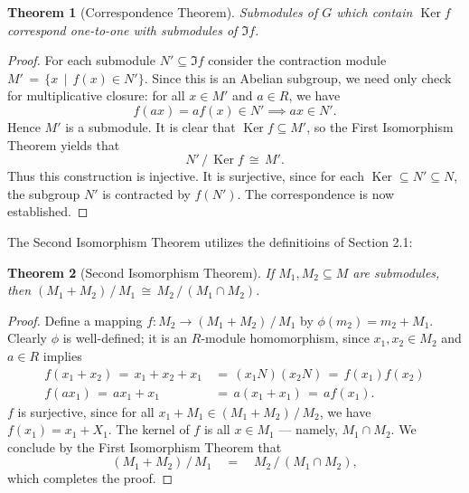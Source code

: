 \documentclass[11pt]{article}
\newtheorem{theorem}{Theorem}
\newcommand{\Ker}{\operatorname{Ker}}
\begin{document}
\begin{adjustwidth}{0.5cm}{}
  \begin{theorem}[Correspondence Theorem]
    Submodules of $G$ which contain $\Ker f$ correspond one-to-one with submodules of $\Im f$.
  \end{theorem}
  \begin{proof}
    For each submodule $N' \subseteq \Im f$ consider the contraction module $M' \, = \, \{ x \, \mid \, f(x) \in N' \}$. Since this is an Abelian subgroup, we need only check for multiplicative closure: for all $x \in M'$ and $a \in R$, we have
    \[
      f(ax) = a f(x) \in N' \implies ax \in N'.
    \]
    Hence $M'$ is a submodule. It is clear that $\Ker f \subseteq M'$, so the First Isomorphism Theorem yields that
    \[
      N' \, / \, \Ker f \, \cong \, M'.
    \]
    Thus this construction is injective. It is surjective, since for each $\Ker \subseteq N' \subseteq N$, the subgroup $N'$ is contracted by $f(N')$. The correspondence is now established.
  \end{proof}
\end{adjustwidth}

The Second Isomorphism Theorem utilizes the definitioins of Section 2.1:

\begin{adjustwidth}{0.5cm}{}
  \begin{theorem}[Second Isomorphism Theorem]
    If $M_{1}, M_{2} \subseteq M$ are submodules, then $(M_{1} + M_{2}) \, / \, M_{1} \, \cong \, M_{2} \, / \, (M_{1} \cap M_{2})$.
  \end{theorem}
  \begin{proof}
    Define a mapping $f : M_{2} \to (M_{1} + M_{2}) \, / \, M_{1}$ by $\phi(m_{2}) = m_{2} + M_{1}$. Clearly $\phi$ is well-defined; it is an $R$-module homomorphism, since $x_{1}, x_{2} \in M_{2}$ and $a \in R$ implies
    \begin{align*}
      f(x_{1} + x_{2}) \, = \, x_{1} + x_{2} + x_{1} \, &= \, (x_{1}N)(x_{2}N) \, = \, f(x_{1}) f(x_{2}) \\
                    f(ax_{1}) \, = \, ax_{1} + x_{1} \, &= \, a(x_{1} + x_{1}) \, = \, a f(x_{1}).
    \end{align*}
    $f$ is surjective, since for all $x_{1} + M_{1} \in (M_{1} + M_{2}) \, / \, M_{2}$, we have $f(x_{1}) = x_{1} + X_{1}$. The kernel of $f$ is all $x \in M_{1}$ --- namely, $M_{1} \cap M_{2}$. We conclude by the First Isomorphism Theorem that
    \[
      (M_{1} + M_{2}) \, / \, M_{1} \quad = \quad M_{2} \, / \, (M_{1} \cap M_{2}),
    \]
    which completes the proof.
  \end{proof}
\end{adjustwidth}
\end{document}
